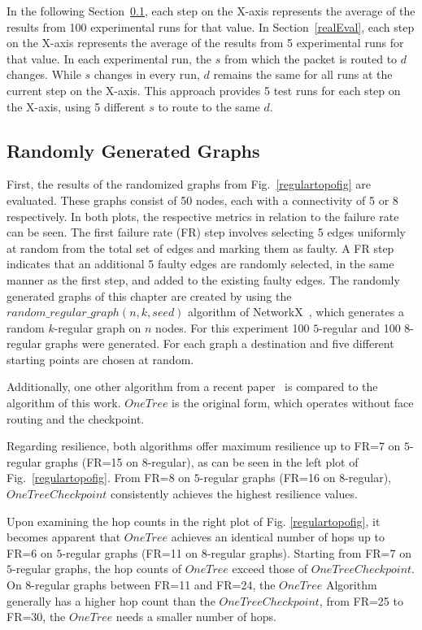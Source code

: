 \documentclass[conference]{IEEEtran}
\begin{document}
In the following Section~\ref{randomEval}, each step on the X-axis represents the average of the results from 100 experimental runs for that value. In Section~\ref{realEval}, each step on the X-axis represents the average of the results from 5 experimental runs for that value. In each experimental run, the $s$ from which the packet is routed to $d$ changes. While $s$ changes in every run, $d$ remains the same for all runs at the current step on the X-axis. This approach provides 5 test runs for each step on the X-axis, using 5 different $s$ to route to the same $d$.

\subsection{Randomly Generated Graphs}
\label{randomEval}
First, the results of the randomized graphs from Fig.~\ref{regulartopofig} are evaluated. These graphs consist of 50 nodes, each with a connectivity of 5 or 8 respectively. In both plots, the respective metrics in relation to the failure rate can be seen. 
The first failure rate (FR) step involves selecting 5 edges uniformly at random from the total set of edges and marking them as faulty.
A FR step indicates that an additional 5 faulty edges are randomly selected, in the same manner as the first step, and added to the existing faulty edges.
The randomly generated graphs of this chapter are created by using the $random\_regular\_graph(n, k, seed)$ algorithm of NetworkX~\cite{networkx}, which generates a random
$k$-regular graph on $n$ nodes. For this experiment 100 $5$-regular and 100 $8$-regular graphs were generated. For each graph a destination
and five different starting points are chosen at random.

Additionally, one other algorithm from a recent paper~\cite{tree} is compared to the algorithm of this work. $OneTree$ is the original form, which operates without face routing and the checkpoint.

Regarding resilience, both algorithms offer maximum resilience up to FR=7 on $5$-regular graphs (FR=15 on $8$-regular), as can be seen in the left plot of Fig.~\ref{regulartopofig}.
From FR=8 on $5$-regular graphs (FR=16 on $8$-regular), $One Tree Checkpoint$ consistently achieves the highest resilience values.

Upon examining the hop counts in the right plot of Fig. \ref{regulartopofig}, it becomes apparent that $OneTree$ achieves an identical number of hops up to FR=6 on $5$-regular graphs (FR=11 on $8$-regular graphs). Starting from FR=7 on $5$-regular graphs, the hop counts of $OneTree$ exceed those of $OneTreeCheckpoint$.
On $8$-regular graphs between FR=11 and FR=24, the $OneTree$ Algorithm generally has a higher hop count than the $One Tree Checkpoint$, from FR=25 to FR=30, the $One Tree$ needs a smaller number of hops.
\end{document}
